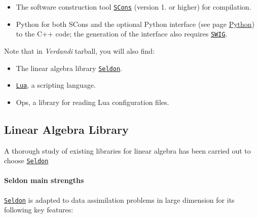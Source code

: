 \documentclass{tufte-book}
\begin{document}
\begin{itemize}
\begin{itemize}
\item The software  construction tool \href{http://www.scons.org/}{\tt \-S\-Cons} (version 1. or higher) for compilation.
\item \-Python for both \-S\-Cons and the optional \-Python interface (see page \hyperlink{python}{\-Python}) to the \-C++ code; the generation of the interface also requires \href{http://www.swig.org/}{\tt \-S\-W\-I\-G}.
\end{itemize}

\-Note that in \-\emph{Verdandi} tarball, you will also find\-:
\begin{itemize}
\item The linear algebra library \href{http://seldon.sourceforge.net/}{\tt \-Seldon}.
\item \href{http://www.lua.org}{\tt \-Lua}, a scripting language.
\item \-Ops, a library for reading \-Lua configuration files.
\end{itemize}

\hypertarget{dependencies_seldon}{}\subsection{Linear Algebra Library}\label{dependencies_seldon}


A thorough study of existing libraries for linear algebra \cite{linear_algebra} has been carried out to choose \href{http://seldon.sourceforge.net/}{\tt \-Seldon}

\paragraph{Seldon main strengths}

\href{http://seldon.sourceforge.net/}{\tt \-Seldon}  is adapted to data assimilation problems in large dimension for its following key features:


\end{itemize}
\end{document}
